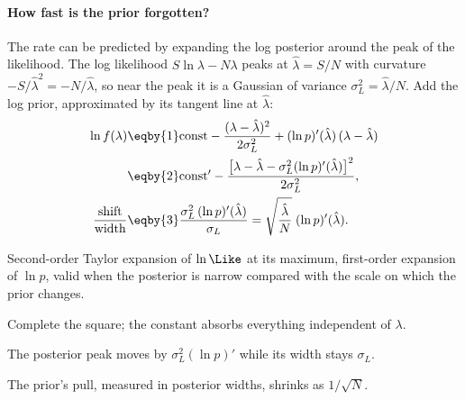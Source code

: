 \paragraph{How fast is the prior forgotten?}
The rate can be predicted by expanding the log posterior around the peak of the likelihood. The
log likelihood $S\ln\lambda-N\lambda$ peaks at $\hat\lambda=S/N$ with curvature
$-S/\hat\lambda^2=-N/\hat\lambda$, so near the peak it is a Gaussian of variance
$\sigma_L^2=\hat\lambda/N$. Add the log prior, approximated by its tangent line at $\hat\lambda$:
\begin{align}
  \ln f(\lambda)
  &\eqby{1}\text{const}-\frac{(\lambda-\hat\lambda)^2}{2\sigma_L^2}
     +(\ln p)'(\hat\lambda)\,(\lambda-\hat\lambda)
  \nonumber\\
  &\eqby{2}\text{const}'-\frac{\bigl[\lambda-\hat\lambda-\sigma_L^2(\ln p)'(\hat\lambda)\bigr]^2}
     {2\sigma_L^2},
  \nonumber\\
  \frac{\text{shift}}{\text{width}}
  &\eqby{3}\frac{\sigma_L^2\,(\ln p)'(\hat\lambda)}{\sigma_L}
   =\sqrt{\frac{\hat\lambda}{N}}\;(\ln p)'(\hat\lambda).
  \label{9b:eq:prior-shift}
\end{align}
\begin{explain}
  \item Second-order Taylor expansion of $\ln\Like$ at its maximum, first-order expansion of
        $\ln p$, valid when the posterior is narrow compared with the scale on which the prior
        changes.
  \item Complete the square; the constant absorbs everything independent of $\lambda$.
  \item The posterior peak moves by $\sigma_L^2(\ln p)'$ while its width stays $\sigma_L$.
\end{explain}
The prior's pull, measured in posterior widths, shrinks as $1/\sqrt N$.

